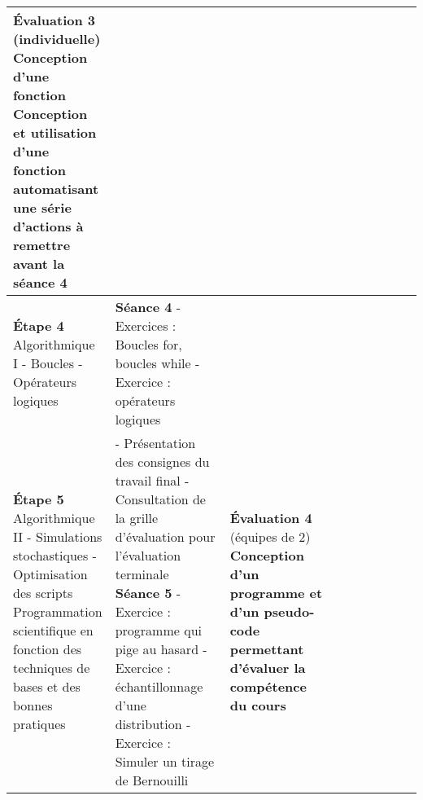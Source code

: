 \documentclass[12]{article}
\begin{document}
\begin{center}
\begin{tabular}{| p{0.1\linewidth} | p{0.3\linewidth} | p{0.3\linewidth} | p{0.3\linewidth} | }
        \textbf{Évaluation 3} (individuelle) \linebreak
        \textbf{Conception d'une fonction}\hfill\hfill \linebreak
    Conception et utilisation d'une fonction automatisant une série d'actions à remettre avant la séance 4\hfill\hfill \\
        \hline
        \textbf{Étape 4}
        Algorithmique I\hfill\hfill \linebreak\linebreak 
            - Boucles\hfill\hfill \linebreak
            - Opérateurs logiques\hfill\hfill &
        \textbf{Séance 4} \linebreak
        - Exercices : Boucles for, boucles while\hfill\hfill \linebreak
        - Exercice : opérateurs logiques\hfill\hfill & 
        \\
        \hline
        \textbf{Étape 5}
        Algorithmique II\hfill\hfill \linebreak\linebreak 
            - Simulations stochastiques\hfill\hfill \linebreak
            - Optimisation des scripts\hfill\hfill \linebreak\linebreak
        Programmation scientifique en fonction des techniques de bases et des bonnes pratiques &
        - Présentation des consignes du travail final \hfill\hfill \linebreak
        - Consultation de la grille d'évaluation pour l'évaluation terminale\hfill\hfill \linebreak
        \textbf{Séance 5} \linebreak
        - Exercice : programme qui pige au hasard\hfill\hfill \linebreak
        - Exercice : échantillonnage d'une distribution\hfill\hfill \linebreak
        - Exercice : Simuler un tirage de Bernouilli\hfill\hfill &
        \textbf{Évaluation 4} (équipes de 2) \linebreak
        \textbf{Conception d'un programme et d'un pseudo-code permettant d’évaluer la compétence du cours}\hfill\hfill \linebreak\linebreak

\end{tabular}
\end{center}
\end{document}
